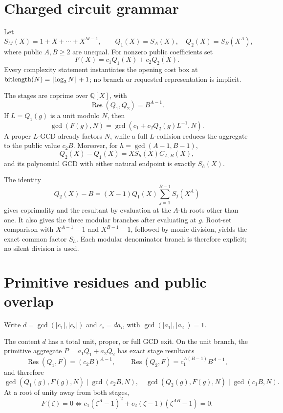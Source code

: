 \documentclass[11pt]{article}
\begin{document}
\section{Charged circuit grammar}

Let
\[
 S_M(X)=1+X+\cdots+X^{M-1},\qquad
 Q_1(X)=S_A(X),\quad Q_2(X)=S_B(X^A),
\]
where public \(A,B\ge2\) are unequal.  For nonzero public coefficients set
\[
 F(X)=c_1Q_1(X)+c_2Q_2(X).
\]
Every complexity statement instantiates the opening cost box at
\(\operatorname{bitlength}(N)=\lfloor\log_2N\rfloor+1\); no branch or requested representation
is implicit.

{}
The stages are coprime over
\(\mathbb Q[X]\), with
\[
 \operatorname{Res}(Q_1,Q_2)=B^{A-1}.
\]
If \(L=Q_1(g)\) is a unit modulo \(N\), then
\[
 \gcd(F(g),N)=
 \gcd(c_1+c_2Q_2(g)L^{-1},N).
\]
A proper \(L\)-GCD already factors \(N\), while a full \(L\)-collision
reduces the aggregate to the public value \(c_2B\).  Moreover, for
\(h=\gcd(A-1,B-1)\),
\[
 Q_2(X)-Q_1(X)=XS_h(X)C_{A,B}(X),
\]
and its polynomial GCD with either natural endpoint is exactly \(S_h(X)\).

\begin{claimproof}
The identity
\[
 Q_2(X)-B=(X-1)Q_1(X)\sum_{j=1}^{B-1}S_j(X^A)
\]
gives coprimality and the resultant by evaluation at the \(A\)-th roots
other than one.  It also gives the three modular branches after evaluating
at \(g\).  Root-set comparison with \(X^{A-1}-1\) and
\(X^{B-1}-1\), followed by monic division, yields the exact common factor
\(S_h\).  Each modular denominator branch is therefore explicit; no silent
division is used.
\end{claimproof}

\section{Primitive residues and public overlap}

Write \(d=\gcd(|c_1|,|c_2|)\) and \(c_i=da_i\), with
\(\gcd(|a_1|,|a_2|)=1\).

{}
The content \(d\) has a total unit, proper,
or full GCD exit.  On the unit branch, the primitive aggregate
\(P=a_1Q_1+a_2Q_2\) has exact stage resultants
\[
 \operatorname{Res}(Q_1,F)=(c_2B)^{A-1},\qquad
 \operatorname{Res}(Q_2,F)=c_1^{A(B-1)}B^{A-1},
\]
and therefore
\[
 \gcd(Q_1(g),F(g),N)\mid\gcd(c_2B,N),\quad
 \gcd(Q_2(g),F(g),N)\mid\gcd(c_1B,N).
\]
At a root of unity away from both stages,
\[
 F(\zeta)=0\iff
 c_1(\zeta^A-1)^2+
 c_2(\zeta-1)(\zeta^{AB}-1)=0.
\]
\end{document}
